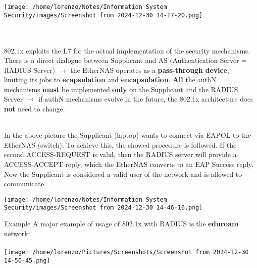 \hspace{0.2cm}
\begin{minipage}{0.4\textwidth}
    \centering
    \texttt{[image: /home/lorenzo/Notes/Information System Security/images/Screenshot from 2024-12-30 14-17-20.png]}
\end{minipage}
\\
\\
802.1x exploits the L7 for the actual implementation of the security mechanisms. There is a
direct dialogue between Supplicant and AS (Authentication Server = RADIUS Server) \(\rightarrow \)
the EtherNAS operates as a \textbf{pass-through device}, limiting its jobs to \textbf{ecapsulation} and \textbf{encapsulation}. \textbf{All} the authN mechanisms \textbf{must} be implemented \textbf{only} on the Supplicant and the RADIUS Server \(\rightarrow \) if authN mechanisms evolve in the future, the 802.1x architecture does \textbf{not} need to change.
\\
\\
\begin{minipage}{0.6\textwidth}
\vspace{-1.5cm}
In the above picture the Supplicant (laptop) wants to connect via EAPOL to the EtherNAS
(switch). To achieve this, the showed procedure is followed. If the second ACCESS-REQUEST
is valid, then the RADIUS server will provide a ACCESS-ACCEPT reply, which the EtherNAS
converts to an EAP Success reply. Now the Supplicant is considered a valid user of the network
and is allowed to communicate.
\end{minipage} 
\hspace{0.2cm}
\begin{minipage}{0.4\textwidth}
    \centering
    \texttt{[image: /home/lorenzo/Notes/Information System Security/images/Screenshot from 2024-12-30 14-46-16.png]}
\end{minipage}
\begin{center}
\begin{quotebox-yellow}{Example}
    \hspace{-2.9cm}
    A major example of usage of 802.1x with RADIUS is the \textbf{eduroam} network:
    \\
    \\
        \centering
        \texttt{[image: /home/lorenzo/Pictures/Screenshots/Screenshot from 2024-12-30 14-50-45.png]}
\end{quotebox-yellow}
\end{center}